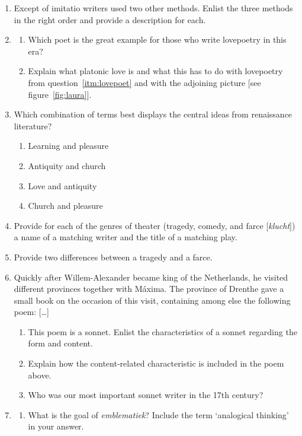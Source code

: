 \begin{enumerate}
\begin{enumerate}
        \end{enumerate}
    \item Except of imitatio writers used two other methods. Enlist the three methods in the right order and provide a description for each.
    \item \begin{enumerate} \item Which poet is the great example for those who write lovepoetry in this era? \label{itm:lovepoet}
            \item Explain what platonic love is and what this has to do with lovepoetry from question~\ref{itm:lovepoet} and with the adjoining picture [see figure~\ref{fig:laura}].\label{itm:platoniclove}
        \end{enumerate}
    \item Which combination of terms best displays the central ideas from renaissance literature?
        \begin{enumerate}
            \item Learning and pleasure
            \item Antiquity and church
            \item Love and antiquity
            \item Church and pleasure
        \end{enumerate}
    \item Provide for each of the genres of theater (tragedy, comedy, and farce [\emph{klucht}]) a name of a matching writer and the title of a matching play.
    \item Provide two differences between a tragedy and a farce.
    \item Quickly after Willem-Alexander became king of the Netherlands, he visited different provinces together with M\'{a}xima. The province of Drenthe gave a small book on the occasion of this visit, containing among else the following poem: [\ldots]
        \begin{enumerate}
            \item This poem is a sonnet. Enlist the characteristics of a sonnet regarding the form and content.
            \item Explain how the content-related characteristic is included in the poem above.
            \item Who was our most important sonnet writer in the 17th century?
        \end{enumerate}
    \item \begin{enumerate} \item What is the goal of \emph{emblematiek}? Include the term `analogical thinking' in your answer.

\end{enumerate}
\end{enumerate}
